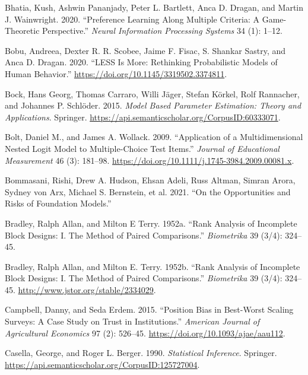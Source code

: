 \documentclass[
  letterpaper,
  numbers=noenddot,
  DIV=11]{scrreprt}
\newlength{\cslhangindent}
\newenvironment{CSLReferences}[2] %
 {\begin{list}{}{%
  \setlength{\itemindent}{0pt}
  \setlength{\leftmargin}{0pt}
  \setlength{\parsep}{0pt}
  \ifodd #1
   \setlength{\leftmargin}{\cslhangindent}
   \setlength{\itemindent}{-1\cslhangindent}
  \fi
  \setlength{\itemsep}{#2\baselineskip}}}
 {\end{list}}
\theoremstyle{definition}
\theoremstyle{plain}
\theoremstyle{plain}
\theoremstyle{remark}
\begin{document}
\label{refs-2}
\begin{CSLReferences}{1}{0}
Bhatia, Kush, Ashwin Pananjady, Peter L. Bartlett, Anca D. Dragan, and
Martin J. Wainwright. 2020. {``Preference Learning Along Multiple
Criteria: A Game-Theoretic Perspective.''} \emph{Neural Information
Processing Systems} 34 (1): 1--12.

Bobu, Andreea, Dexter R. R. Scobee, Jaime F. Fisac, S. Shankar Sastry,
and Anca D. Dragan. 2020. {``LESS Is More: Rethinking Probabilistic
Models of Human Behavior.''}
\url{https://doi.org/10.1145/3319502.3374811}.

Bock, Hans Georg, Thomas Carraro, Willi Jäger, Stefan Körkel, Rolf
Rannacher, and Johannes P. Schlöder. 2015. \emph{Model Based Parameter
Estimation: Theory and Applications}. Springer.
\url{https://api.semanticscholar.org/CorpusID:60333071}.

Bolt, Daniel M., and James A. Wollack. 2009. {``Application of a
Multidimensional Nested Logit Model to Multiple-Choice Test Items.''}
\emph{Journal of Educational Measurement} 46 (3): 181--98.
\url{https://doi.org/10.1111/j.1745-3984.2009.00081.x}.

Bommasani, Rishi, Drew A. Hudson, Ehsan Adeli, Russ Altman, Simran
Arora, Sydney von Arx, Michael S. Bernstein, et al. 2021. {``On the
Opportunities and Risks of Foundation Models.''}

Bradley, Ralph Allan, and Milton E Terry. 1952a. {``Rank Analysis of
Incomplete Block Designs: I. The Method of Paired Comparisons.''}
\emph{Biometrika} 39 (3/4): 324--45.

Bradley, Ralph Allan, and Milton E. Terry. 1952b. {``Rank Analysis of
Incomplete Block Designs: I. The Method of Paired Comparisons.''}
\emph{Biometrika} 39 (3/4): 324--45.
\url{http://www.jstor.org/stable/2334029}.

Campbell, Danny, and Seda Erdem. 2015. {``Position Bias in Best-Worst
Scaling Surveys: A Case Study on Trust in Institutions.''}
\emph{American Journal of Agricultural Economics} 97 (2): 526--45.
\url{https://doi.org/10.1093/ajae/aau112}.

Casella, George, and Roger L. Berger. 1990. \emph{Statistical
Inference}. Springer.
\url{https://api.semanticscholar.org/CorpusID:125727004}.


\end{CSLReferences}
\end{document}
